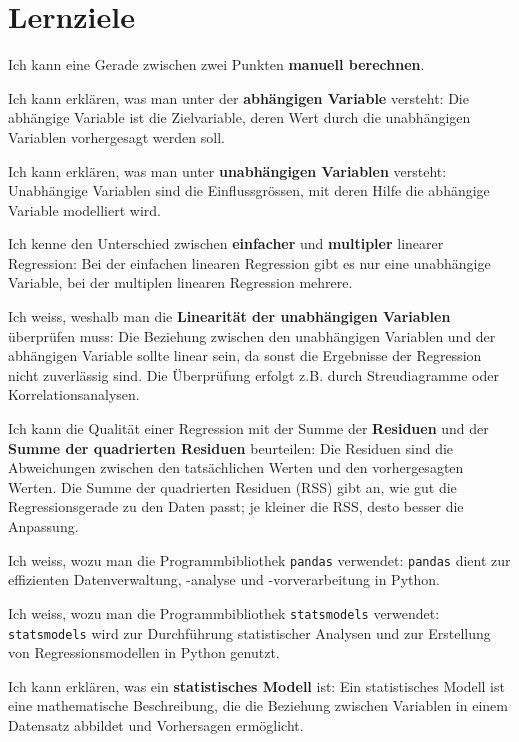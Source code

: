 \section{Lernziele}
\begin{todolist}
    \item Ich kann eine Gerade zwischen zwei Punkten \textbf{manuell berechnen}.
    \item Ich kann erklären, was man unter der \textbf{abhängigen Variable} versteht: Die abhängige Variable ist die Zielvariable, deren Wert durch die unabhängigen Variablen vorhergesagt werden soll.
    \item Ich kann erklären, was man unter \textbf{unabhängigen Variablen} versteht: Unabhängige Variablen sind die Einflussgrössen, mit deren Hilfe die abhängige Variable modelliert wird.
    \item Ich kenne den Unterschied zwischen \textbf{einfacher} und \textbf{multipler} linearer Regression: Bei der einfachen linearen Regression gibt es nur eine unabhängige Variable, bei der multiplen linearen Regression mehrere.
    \item Ich weiss, weshalb man die \textbf{Linearität der unabhängigen Variablen} überprüfen muss: Die Beziehung zwischen den unabhängigen Variablen und der abhängigen Variable sollte linear sein, da sonst die Ergebnisse der Regression nicht zuverlässig sind. Die Überprüfung erfolgt z.B. durch Streudiagramme oder Korrelationsanalysen.
    \item Ich kann die Qualität einer Regression mit der Summe der \textbf{Residuen} und der \textbf{Summe der quadrierten Residuen} beurteilen: Die Residuen sind die Abweichungen zwischen den tatsächlichen Werten und den vorhergesagten Werten. Die Summe der quadrierten Residuen (RSS) gibt an, wie gut die Regressionsgerade zu den Daten passt; je kleiner die RSS, desto besser die Anpassung.
    \item Ich weiss, wozu man die Programmbibliothek \texttt{pandas} verwendet: \texttt{pandas} dient zur effizienten Datenverwaltung, -analyse und -vorverarbeitung in Python.
    \item Ich weiss, wozu man die Programmbibliothek \texttt{statsmodels} verwendet: \texttt{statsmodels} wird zur Durchführung statistischer Analysen und zur Erstellung von Regressionsmodellen in Python genutzt.
    \item Ich kann erklären, was ein \textbf{statistisches Modell} ist: Ein statistisches Modell ist eine mathematische Beschreibung, die die Beziehung zwischen Variablen in einem Datensatz abbildet und Vorhersagen ermöglicht.
\end{todolist}